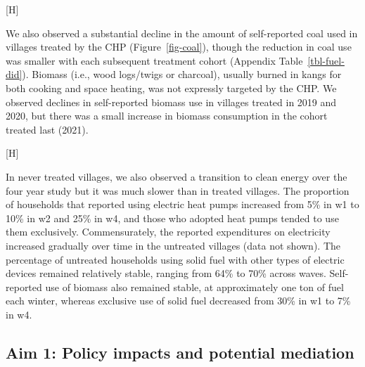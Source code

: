 \documentclass[
  letterpaper,
  DIV=11,
  numbers=noendperiod]{scrartcl}
\makeatletter
\renewenvironment{figure}%
   {\renewcommand\familydefault\sfdefault
    \@float{figure}}
   {\end@float}
\makeatother
\begin{document}
\begin{figure}[H]


\caption{\label{fig-sankey}Transitions to different energy sources
across study waves}

\end{figure}%

We also observed a substantial decline in the amount of self-reported
coal used in villages treated by the CHP (Figure~\ref{fig-coal}), though
the reduction in coal use was smaller with each subsequent treatment
cohort (Appendix Table~\ref{tbl-fuel-did}). Biomass (i.e., wood
logs/twigs or charcoal), usually burned in kangs for both cooking and
space heating, was not expressly targeted by the CHP. We observed
declines in self-reported biomass use in villages treated in 2019 and
2020, but there was a small increase in biomass consumption in the
cohort treated last (2021).

\begin{figure}[H]


\caption{\label{fig-coal}Trends in self-reported coal and biomass, by
treatment season.}

\end{figure}%

In never treated villages, we also observed a transition to clean energy
over the four year study but it was much slower than in treated
villages. The proportion of households that reported using electric heat
pumps increased from 5\% in w1 to 10\% in w2 and 25\% in w4, and those
who adopted heat pumps tended to use them exclusively. Commensurately,
the reported expenditures on electricity increased gradually over time
in the untreated villages (data not shown). The percentage of untreated
households using solid fuel with other types of electric devices
remained relatively stable, ranging from 64\% to 70\% across waves.
Self-reported use of biomass also remained stable, at approximately one
ton of fuel each winter, whereas exclusive use of solid fuel decreased
from 30\% in w1 to 7\% in w4.

\subsection{Aim 1: Policy impacts and potential
mediation}\label{aim-1-policy-impacts-and-potential-mediation}
\end{document}
